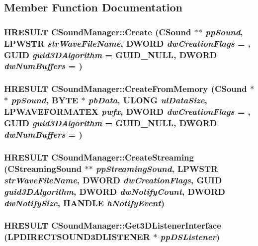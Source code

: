 \subsection{Member Function Documentation}
\hypertarget{class_c_sound_manager_a7fb7f2a69f7b703da0c81988733d7e31}{
\subsubsection[{Create}]{\setlength{\rightskip}{0pt plus 5cm}HRESULT CSoundManager::Create ({\bf CSound} $\ast$$\ast$ {\em ppSound}, \/  {\bf LPWSTR} {\em strWaveFileName}, \/  DWORD {\em dwCreationFlags} = {}, \/  GUID {\em guid3DAlgorithm} = {\ttfamily GUID\_\-NULL}, \/  DWORD {\em dwNumBuffers} = {})}}
\label{class_c_sound_manager_a7fb7f2a69f7b703da0c81988733d7e31}
\hypertarget{class_c_sound_manager_aeb9aceb7a20e21ec18922fe71cd58307}{
\subsubsection[{CreateFromMemory}]{\setlength{\rightskip}{0pt plus 5cm}HRESULT CSoundManager::CreateFromMemory ({\bf CSound} $\ast$$\ast$ {\em ppSound}, \/  BYTE $\ast$ {\em pbData}, \/  ULONG {\em ulDataSize}, \/  LPWAVEFORMATEX {\em pwfx}, \/  DWORD {\em dwCreationFlags} = {}, \/  GUID {\em guid3DAlgorithm} = {\ttfamily GUID\_\-NULL}, \/  DWORD {\em dwNumBuffers} = {})}}
\label{class_c_sound_manager_aeb9aceb7a20e21ec18922fe71cd58307}
\hypertarget{class_c_sound_manager_abbcd3543cde00e741c02ae2864516a2c}{
\subsubsection[{CreateStreaming}]{\setlength{\rightskip}{0pt plus 5cm}HRESULT CSoundManager::CreateStreaming ({\bf CStreamingSound} $\ast$$\ast$ {\em ppStreamingSound}, \/  {\bf LPWSTR} {\em strWaveFileName}, \/  DWORD {\em dwCreationFlags}, \/  GUID {\em guid3DAlgorithm}, \/  DWORD {\em dwNotifyCount}, \/  DWORD {\em dwNotifySize}, \/  HANDLE {\em hNotifyEvent})}}
\label{class_c_sound_manager_abbcd3543cde00e741c02ae2864516a2c}
\hypertarget{class_c_sound_manager_aac5c452d3d4314c8d3aeb16f9c143652}{
\subsubsection[{Get3DListenerInterface}]{\setlength{\rightskip}{0pt plus 5cm}HRESULT CSoundManager::Get3DListenerInterface (LPDIRECTSOUND3DLISTENER $\ast$ {\em ppDSListener})}}
